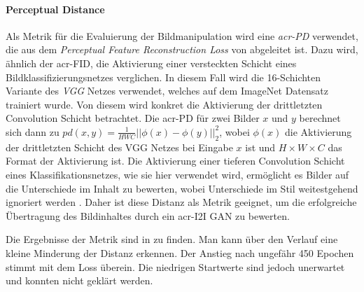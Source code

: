  \paragraph{Perceptual Distance} Als Metrik für die Evaluierung der
 Bildmanipulation wird eine \emph{\gls{acr-PD}} \cite{pang2021image} verwendet, die aus dem
 \emph{Perceptual Feature Reconstruction Loss} von
 \citeauthor{johnson_perceptual_2016} \cite{johnson_perceptual_2016} abgeleitet ist. Dazu wird, ähnlich der
 \gls{acr-FID}, die Aktivierung einer versteckten Schicht eines
 Bildklassifizierungsnetzes verglichen. In diesem Fall wird die 16-Schichten
 Variante des \emph{VGG} Netzes \cite{simonyan2014very} verwendet, welches auf
 dem ImageNet \cite{russakovsky2015imagenet} Datensatz trainiert wurde. Von diesem
 wird konkret die Aktivierung der drittletzten Convolution Schicht betrachtet.
 Die \gls{acr-PD} für zwei Bilder $x$ und $y$ berechnet sich dann zu $pd(x,y) = \frac{1}{HWC}
 ||\phi(x) - \phi(y)||_2^{2}$, wobei $\phi(x)$ die Aktivierung der drittletzten
 Schicht des VGG Netzes bei Eingabe $x$ ist und $H \times W \times C$ das Format
 der Aktivierung ist. Die Aktivierung einer tieferen
 Convolution Schicht eines Klassifikationsnetzes, wie sie hier verwendet wird,
 ermöglicht es Bilder auf die Unterschiede im Inhalt zu bewerten, wobei
 Unterschiede im Stil weitestgehend ignoriert werden
 \cite{johnson_perceptual_2016,pang2021image}. Daher ist diese Distanz als
 Metrik geeignet, um die erfolgreiche Übertragung des Bildinhaltes durch ein
 \gls{acr-I2I} GAN zu bewerten.
 
 Die Ergebnisse der Metrik sind in  zu finden. 
 Man kann über den Verlauf eine kleine Minderung der Distanz erkennen. Der Anstieg nach ungefähr 
 450 Epochen stimmt mit dem Loss überein. Die niedrigen Startwerte sind jedoch unerwartet und 
 konnten nicht geklärt werden. 
 
 
 
